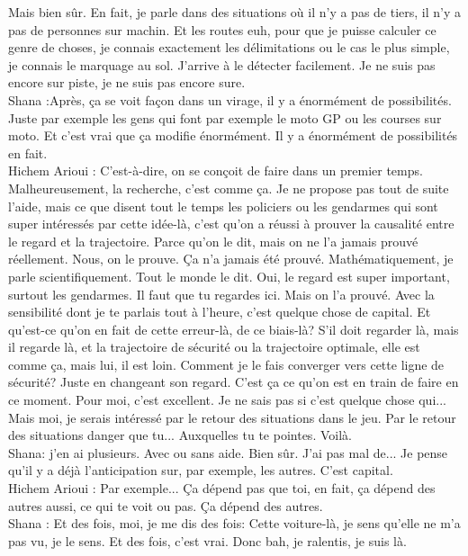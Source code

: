 Mais bien sûr. En fait, je parle dans des situations où il n'y a pas de tiers, il n'y a pas de personnes sur machin. Et les routes euh, pour que je puisse calculer ce genre de choses, je connais exactement les délimitations ou le cas le plus simple, je connais le marquage au sol. J'arrive à le détecter facilement. Je ne suis pas encore sur piste, je ne suis pas encore sure. \\
Shana :Après, ça se voit façon dans un virage, il y a énormément de possibilités. Juste par exemple les gens qui font par exemple le moto GP ou les courses sur moto. Et c'est vrai que ça modifie énormément. Il y a énormément de possibilités en fait.\\
Hichem Arioui : C'est-à-dire, on se conçoit de faire dans un premier temps. Malheureusement, la recherche, c'est comme ça. Je ne propose pas tout de suite l'aide, mais ce que disent tout le temps les policiers ou les gendarmes qui sont super intéressés par cette idée-là, c'est qu'on a réussi à prouver la causalité entre le regard et la trajectoire. Parce qu'on le dit, mais on ne l'a jamais prouvé réellement. Nous, on le prouve. Ça n'a jamais été prouvé. Mathématiquement, je parle scientifiquement. Tout le monde le dit. Oui, le regard est super important, surtout les gendarmes. Il faut que tu regardes ici. Mais on l'a prouvé. Avec la sensibilité dont je te parlais tout à l'heure, c'est quelque chose de capital. Et qu'est-ce qu'on en fait de cette erreur-là, de ce biais-là? S'il doit regarder là, mais il regarde là, et la trajectoire de sécurité ou la trajectoire optimale, elle est comme ça, mais lui, il est loin. Comment je le fais converger vers cette ligne de sécurité? Juste en changeant son regard. C'est ça ce qu'on est en train de faire en ce moment. Pour moi, c'est excellent. Je ne sais pas si c'est quelque chose qui... Mais moi, je serais intéressé par le retour des situations dans le jeu. Par le retour des situations danger que tu... Auxquelles tu te pointes. Voilà. \\
Shana: j'en ai plusieurs. Avec ou sans aide. Bien sûr. J'ai pas mal de... Je pense qu'il y a déjà l'anticipation sur, par exemple, les autres. 
C'est capital.\\
Hichem Arioui : Par exemple... Ça dépend pas que toi, en fait, ça dépend des autres aussi, ce qui te voit ou pas. Ça dépend des autres.\\
Shana : Et des fois, moi, je me dis des fois: Cette voiture-là, je sens qu'elle ne m'a pas vu, je le sens. Et des fois, c'est vrai. Donc bah, je ralentis, je suis là. \\
